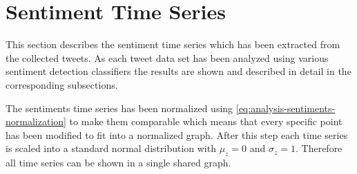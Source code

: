 

\section{Sentiment Time Series}
\label{s:analysis-sentiments}

This section describes the sentiment time series which has been extracted from the collected tweets.
As each tweet data set has been analyzed using various sentiment detection classifiers the results are shown and described in detail in the corresponding subsections.

The sentiments time series has been normalized using \cref{eq:analysis-sentiments-normalization} to make them comparable which means that every specific point has been modified to fit into a normalized graph.
After this step each time series is scaled into a standard normal distribution with $\mu_z = 0$ and $\sigma_z = 1$.
Therefore all time series can be shown in a single shared graph.

